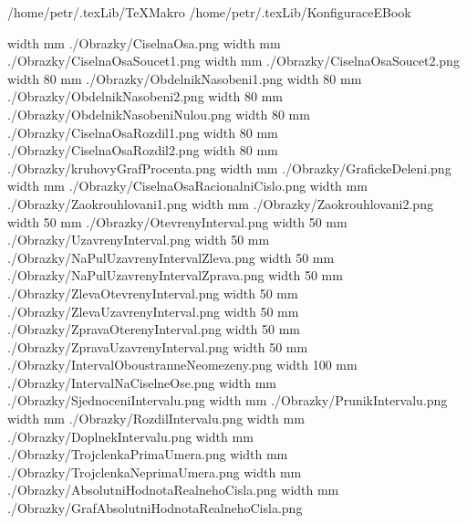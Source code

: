 \def\addr{/home/petr/.texLib/}

 \addr TeXMakro
\setAddress{\addr}
 \addr KonfiguraceEBook

\pdfximage width \the\SirkaOdstavce mm {./Obrazky/CiselnaOsa.png}
\pdfximage width \the\SirkaOdstavce mm {./Obrazky/CiselnaOsaSoucet1.png}
\pdfximage width \the\SirkaOdstavce mm {./Obrazky/CiselnaOsaSoucet2.png}
\pdfximage width 80 mm {./Obrazky/ObdelnikNasobeni1.png}
\pdfximage width 80 mm {./Obrazky/ObdelnikNasobeni2.png}
\pdfximage width 80 mm {./Obrazky/ObdelnikNasobeniNulou.png}
\pdfximage width 80 mm {./Obrazky/CiselnaOsaRozdil1.png}
\pdfximage width 80 mm {./Obrazky/CiselnaOsaRozdil2.png}
\pdfximage width 80 mm {./Obrazky/kruhovyGrafProcenta.png}
\pdfximage width \the\SirkaOdstavce mm {./Obrazky/GrafickeDeleni.png}
\pdfximage width \the\SirkaOdstavce mm {./Obrazky/CiselnaOsaRacionalniCislo.png}
\pdfximage width \the\SirkaOdstavce mm {./Obrazky/Zaokrouhlovani1.png}
\pdfximage width \the\SirkaOdstavce mm {./Obrazky/Zaokrouhlovani2.png}
\pdfximage width 50 mm {./Obrazky/OtevrenyInterval.png}
\pdfximage width 50 mm {./Obrazky/UzavrenyInterval.png}
\pdfximage width 50 mm {./Obrazky/NaPulUzavrenyIntervalZleva.png}
\pdfximage width 50 mm {./Obrazky/NaPulUzavrenyIntervalZprava.png}
\pdfximage width 50 mm {./Obrazky/ZlevaOtevrenyInterval.png}
\pdfximage width 50 mm {./Obrazky/ZlevaUzavrenyInterval.png}
\pdfximage width 50 mm {./Obrazky/ZpravaOterenyInterval.png}
\pdfximage width 50 mm {./Obrazky/ZpravaUzavrenyInterval.png}
\pdfximage width 50 mm {./Obrazky/IntervalOboustranneNeomezeny.png}
\pdfximage width 100 mm {./Obrazky/IntervalNaCiselneOse.png}
\pdfximage width \the\SirkaOdstavce mm {./Obrazky/SjednoceniIntervalu.png}
\pdfximage width \the\SirkaOdstavce mm {./Obrazky/PrunikIntervalu.png}
\pdfximage width \the\SirkaOdstavce mm {./Obrazky/RozdilIntervalu.png}
\pdfximage width \the\SirkaOdstavce mm {./Obrazky/DoplnekIntervalu.png}
\pdfximage width \the\SirkaOdstavce mm {./Obrazky/TrojclenkaPrimaUmera.png}
\pdfximage width \the\SirkaOdstavce mm {./Obrazky/TrojclenkaNeprimaUmera.png}
\pdfximage width \the\SirkaOdstavce mm {./Obrazky/AbsolutniHodnotaRealnehoCisla.png}
\pdfximage width \the\SirkaOdstavce mm {./Obrazky/GrafAbsolutniHodnotaRealnehoCisla.png}



\Obsah



